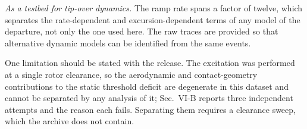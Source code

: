 \documentclass[10pt]{article}
\begin{document}
\emph{As a testbed for tip-over dynamics.} The ramp rate spans a factor
of twelve, which separates the rate-dependent and excursion-dependent
terms of any model of the departure, not only the one used here. The
raw traces are provided so that alternative dynamic models can be
identified from the same events.

One limitation should be stated with the release. The excitation was
performed at a single rotor clearance, so the aerodynamic and
contact-geometry contributions to the static threshold deficit are
degenerate in this dataset and cannot be separated by any analysis of
it; Sec.~VI-B reports three independent attempts and the reason each
fails. Separating them requires a clearance sweep, which the archive
does not contain.

\end{document}
